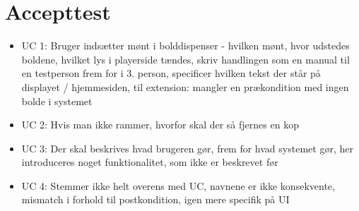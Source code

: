 \documentclass[a4paper,12pt,fleqn,oneside]{article}
\begin{document}
\section{Accepttest}
\begin{itemize}
    \item UC 1: Bruger indsætter mønt i bolddispenser - hvilken mønt, hvor udstedes boldene, hvilket lys i playerside tændes, skriv handlingen som en manual til en testperson frem for i 3. person, specificer hvilken tekst der står på displayet / hjemmesiden, 
    til extension: mangler en prækondition med ingen bolde i systemet
    \item UC 2: Hvis man ikke rammer, hvorfor skal der så fjernes en kop
    \item UC 3: Der skal beskrives hvad brugeren gør, frem for hvad systemet gør, her introduceres noget funktionalitet, som ikke er beskrevet før 
    \item UC 4: Stemmer ikke helt overens med UC, navnene er ikke konsekvente, mismatch i forhold til postkondition, igen mere specifik på UI
\end{itemize}
\end{document}

